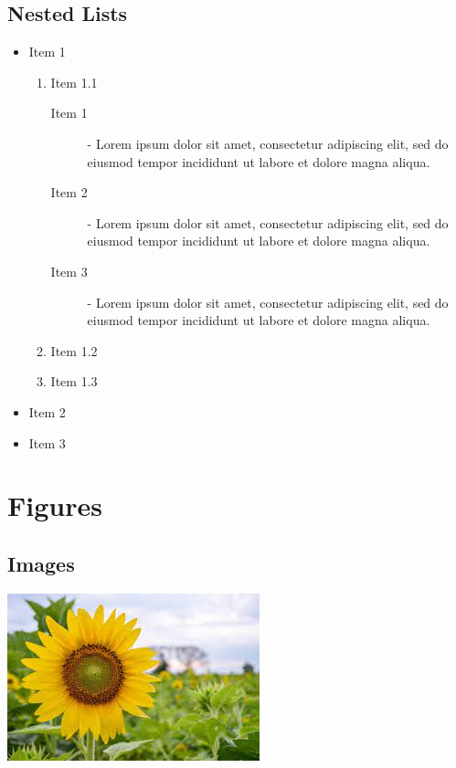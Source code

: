 \documentclass[a4paper, 12pt]{report}
\begin{document}
\section{Nested Lists}
\begin{itemize}
	\item Item 1
	\begin{enumerate}
		\item Item 1.1
		\begin{description}
			\item[Item 1] - Lorem ipsum dolor sit amet, consectetur adipiscing elit, sed do eiusmod tempor incididunt ut labore et dolore magna aliqua.
			\item[Item 2] - Lorem ipsum dolor sit amet, consectetur adipiscing elit, sed do eiusmod tempor incididunt ut labore et dolore magna aliqua.
			\item[Item 3] - Lorem ipsum dolor sit amet, consectetur adipiscing elit, sed do eiusmod tempor incididunt ut labore et dolore magna aliqua.
		\end{description}
		\item Item 1.2
		\item Item 1.3
	\end{enumerate}
	\item Item 2
	\item Item 3
\end{itemize}



\chapter{Figures}
\section{Images}
\includegraphics[scale=1]{sample_img_1}
\end{document}
